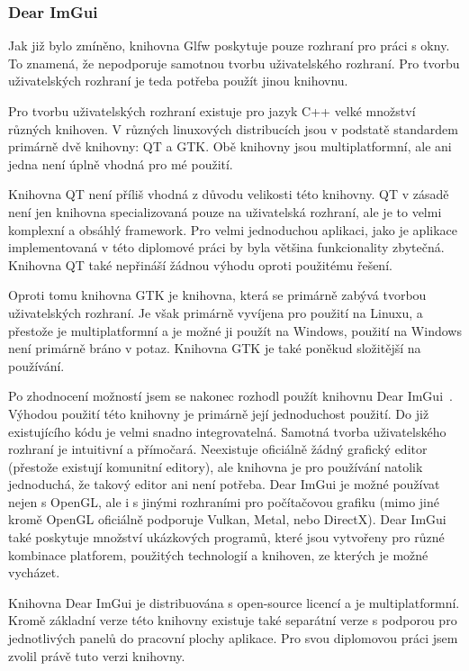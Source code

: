 \documentclass[czech,master]{diploma}
\begin{document}
\subsubsection*{Dear ImGui}
Jak již bylo zmíněno, knihovna Glfw poskytuje pouze rozhraní pro práci s okny. To znamená, že nepodporuje samotnou tvorbu uživatelského rozhraní. Pro tvorbu uživatelských rozhraní je teda potřeba použít jinou knihovnu.\par
Pro tvorbu uživatelských rozhraní existuje pro jazyk C++ velké množství různých knihoven. V různých linuxových distribucích jsou v podstatě standardem primárně dvě knihovny: QT a GTK\@. Obě knihovny jsou multiplatformní, ale ani jedna není úplně vhodná pro mé použití.\par Knihovna QT není příliš vhodná z důvodu velikosti této knihovny. QT v zásadě není jen knihovna specializovaná pouze na uživatelská rozhraní, ale je to velmi komplexní a obsáhlý framework. Pro velmi jednoduchou aplikaci, jako je aplikace implementovaná v této diplomové práci by byla většina funkcionality zbytečná. Knihovna QT také nepřináší žádnou výhodu oproti použitému řešení.\par
Oproti tomu knihovna GTK je knihovna, která se primárně zabývá tvorbou uživatelských rozhraní. Je však primárně vyvíjena pro použití na Linuxu, a přestože je multiplatformní a je možné ji použít na Windows, použití na Windows není primárně bráno v potaz. Knihovna GTK je také poněkud složitější na používání.\par
Po zhodnocení možností jsem se nakonec rozhodl použít knihovnu Dear ImGui~\cite{sourceImgui}. Výhodou použití této knihovny je primárně její jednoduchost použití. Do již existujícího kódu je velmi snadno integrovatelná. Samotná tvorba uživatelského rozhraní je intuitivní a přímočará. Neexistuje oficiálně žádný grafický editor (přestože existují komunitní editory), ale knihovna je pro používání natolik jednoduchá, že takový editor ani není potřeba. Dear ImGui je možné používat nejen s OpenGL, ale i s jinými rozhraními pro počítačovou grafiku (mimo jiné kromě OpenGL oficiálně podporuje Vulkan, Metal, nebo DirectX). Dear ImGui také poskytuje množství ukázkových programů, které jsou vytvořeny pro různé kombinace platforem, použitých technologií a knihoven, ze kterých je možné vycházet.\par
Knihovna Dear ImGui je distribuována s open-source licencí a je multiplatformní. Kromě základní verze této knihovny existuje také separátní verze s podporou pro  jednotlivých panelů do pracovní plochy aplikace. Pro svou diplomovou práci jsem zvolil právě tuto verzi knihovny.
\end{document}
